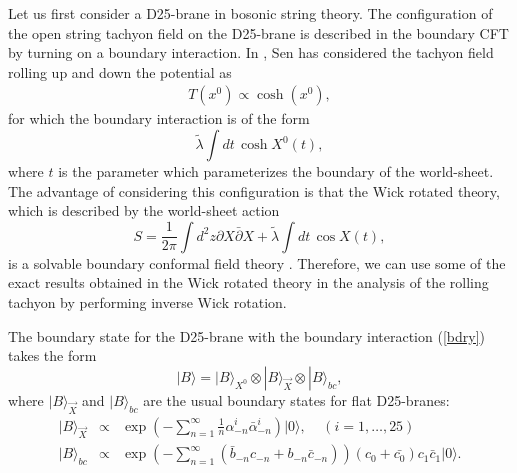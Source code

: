 \documentclass[a4paper,12pt]{article} \textheight=8.5truein
\begin{document}
Let us first consider a D25-brane in bosonic string theory. The
configuration of the open string tachyon field on the D25-brane is
described in the boundary CFT by turning on a boundary
interaction. In \cite{Sen:2002nu}, Sen has considered the tachyon
field rolling up and down the potential as
\begin{eqnarray}
T(x^0)\propto\cosh(x^0),
\end{eqnarray}
for which the boundary interaction is of the form
\begin{equation}
  \tilde{\lambda}\int dt\,\cosh X^0(t),
\label{bdry}
\end{equation}
where $t$ is the parameter which parameterizes
the boundary of the world-sheet.
The advantage of considering this configuration is that
the Wick rotated theory, which is described by the world-sheet action
\begin{equation}
S=\frac{1}{2\pi}\int d^2 z \partial X \bar{\partial} X
+\tilde{\lambda}\int dt\, \cos X(t),
\label{wick}
\end{equation}
is a solvable boundary conformal field theory
\cite{Callan:1994ub,Polchinski:my,Recknagel}. Therefore, we can use some of
the exact results obtained in the Wick rotated theory in the
analysis of the rolling tachyon by performing inverse Wick
rotation.

The boundary state for the D25-brane with the boundary interaction
(\ref{bdry}) takes the form
\begin{equation}
  |B\rangle=|B\rangle_{X^0} \otimes |B\rangle_{\vec{X}} \otimes |B\rangle_{bc},
\end{equation}
where $|B\rangle_{\vec{X}}$ and $ |B\rangle_{bc}$ are the usual
boundary states for flat D25-branes:
\begin{eqnarray}
  |B\rangle_{\vec{X}} &\propto&\exp\left(-\sum_{n=1}^\infty
 \frac{1}{n}\alpha_{-n}^i \bar{\alpha}_{-n}^i\right)|0\rangle,
 ~~~~~(i=1,\dots,25)\\
 |B\rangle_{bc}&\propto&\exp\left(-\sum_{n=1}^{\infty}(\bar{b}_{-n}c_{-n}
+b_{-n}\bar{c}_{-n})\right)(c_0+\bar{c_0})c_1\bar{c}_1|0\rangle.
\end{eqnarray}
\end{document}
